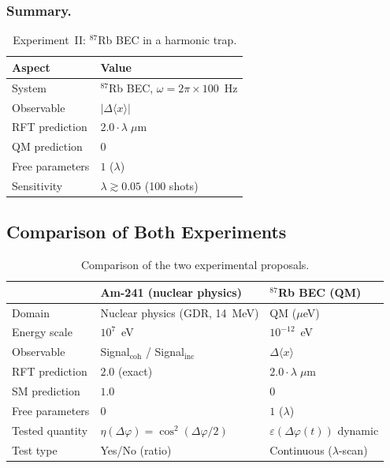 \documentclass[12pt]{iopart}
\begin{document}
	\subsubsection{Summary.}
	
	\begin{table}[ht]
		\centering
		\caption{Experiment~II:
			${}^{87}$Rb BEC in a harmonic trap.}
		\label{tab:exp_rb87}
		\begin{tabular}{ll}
			\hline
			\textbf{Aspect} & \textbf{Value} \\
			\hline
			System & ${}^{87}$Rb BEC,
			$\omega = 2\pi \times 100$~Hz \\
			Observable &
			$|\Delta\langle x\rangle|$ \\
			RFT prediction &
			$2.0 \cdot \lambda\;\mu$m \\
			QM prediction & $0$ \\
			Free parameters & $1$ ($\lambda$) \\
			Sensitivity &
			$\lambda \gtrsim 0.05$ (100 shots) \\
			\hline
		\end{tabular}
	\end{table}
	
	\subsection{Comparison of Both Experiments}
	\label{sec:exp_vergleich}
	
	\begin{table}[ht]
		\centering
		\caption{Comparison of the two
			experimental proposals.}
		\label{tab:exp_comparison}
		\begin{tabular}{lll}
			\hline
			& \textbf{Am-241 (nuclear physics)}
			& \textbf{${}^{87}$Rb BEC (QM)} \\
			\hline
			Domain & Nuclear physics (GDR, 14~MeV)
			& QM ($\mu$eV) \\
			Energy scale & $10^7$~eV
			& $10^{-12}$~eV \\
			Observable
			& Signal$_{\mathrm{coh}}$ /
			Signal$_{\mathrm{inc}}$
			& $\Delta\langle x\rangle$ \\
			RFT prediction & $2.0$ (exact)
			& $2.0 \cdot \lambda\;\mu$m \\
			SM prediction & $1.0$
			& $0$ \\
			Free parameters & $0$
			& $1$ ($\lambda$) \\
			Tested quantity
			& $\eta(\Delta\varphi) = \cos^2(\Delta\varphi/2)$
			& $\varepsilon(\Delta\varphi(t))$ dynamic \\
			Test type & Yes/No (ratio)
			& Continuous ($\lambda$-scan) \\
			\hline
		\end{tabular}
	\end{table}
	
\end{document}
